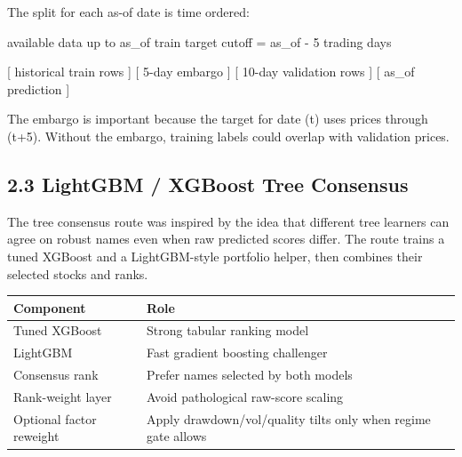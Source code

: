\documentclass[11pt]{article}
\newenvironment{Shaded}{}{}
\newcommand{\NormalTok}[1]{#1}
\begin{document}
The split for each as-of date is time ordered:

\begin{Shaded}
\begin{Highlighting}[]
\NormalTok{available data up to as\_of}
\NormalTok{train target cutoff = as\_of {-} 5 trading days}

\NormalTok{[ historical train rows ] [ 5{-}day embargo ] [ 10{-}day validation rows ] [ as\_of prediction ]}
\end{Highlighting}
\end{Shaded}

The embargo is important because the target for date (t) uses prices
through (t+5). Without the embargo, training labels could overlap with
validation prices.

\subsection{2.3 LightGBM / XGBoost Tree
Consensus}\label{lightgbm-xgboost-tree-consensus}

The tree consensus route was inspired by the idea that different tree
learners can agree on robust names even when raw predicted scores
differ. The route trains a tuned XGBoost and a LightGBM-style portfolio
helper, then combines their selected stocks and ranks.

\begin{longtable}[]{@{}|
  >{\RaggedRight\arraybackslash}m{}|
  >{\RaggedRight\arraybackslash}m{}|@{}}
\hline\rowcolor{tableHead}
\begin{minipage}[c]{\linewidth}\centering\bfseries
Component
\end{minipage} & \begin{minipage}[c]{\linewidth}\centering\bfseries
Role
\end{minipage} \\
\hline
\endhead
\hline
\endlastfoot
Tuned XGBoost & Strong tabular ranking model \\
\hline
LightGBM & Fast gradient boosting challenger \\
\hline
Consensus rank & Prefer names selected by both models \\
\hline
Rank-weight layer & Avoid pathological raw-score scaling \\
\hline
Optional factor reweight & Apply drawdown/vol/quality tilts only when
regime gate allows \\
\end{longtable}
\end{document}
